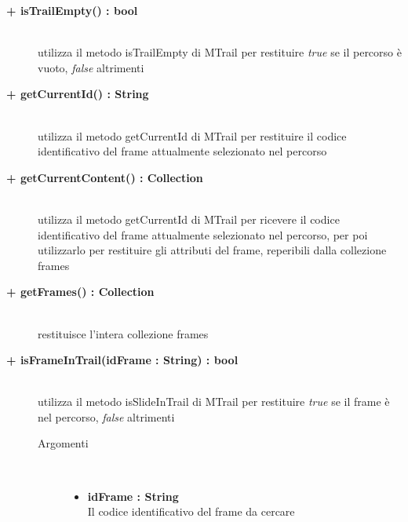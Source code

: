 \begin{description}
	
	\begin{description}
		\item[\textbf{\color{blue}+ isTrailEmpty() : bool		}] \hfill \\
			utilizza il metodo isTrailEmpty di MTrail per restituire \textit{true} se il percorso è vuoto, \textit{false} altrimenti
	\end{description}
	
	\begin{description}
		\item[\textbf{\color{blue}+ getCurrentId() : String		}] \hfill \\
			utilizza il metodo getCurrentId di MTrail per restituire il codice identificativo del frame attualmente selezionato nel percorso
	\end{description}
	
	\begin{description}
		\item[\textbf{\color{blue}+ getCurrentContent() : Collection		}] \hfill \\
			utilizza il metodo getCurrentId di MTrail per ricevere il codice identificativo del frame attualmente selezionato nel percorso, per poi utilizzarlo per restituire gli attributi del frame, reperibili dalla collezione frames
	\end{description}
	
	\begin{description}
		\item[\textbf{\color{blue}+ getFrames() : Collection		}] \hfill \\
			restituisce l'intera collezione frames
	\end{description}
	
	
	\begin{description}
		\item[\textbf{\color{blue}+ isFrameInTrail(idFrame : String) : bool			}] \hfill \\
			utilizza il metodo isSlideInTrail di MTrail per restituire \textit{true} se il frame è nel percorso, \textit{false} altrimenti
			
		\begin{description}
			\item[Argomenti] \hfill \\
				\begin{itemize}
				
					\item \textbf{idFrame : String			} \hfill \\
					Il codice identificativo del frame da cercare
					
				\end{itemize}
			
		\end{description}
	\end{description}
	
\end{description}	
	
